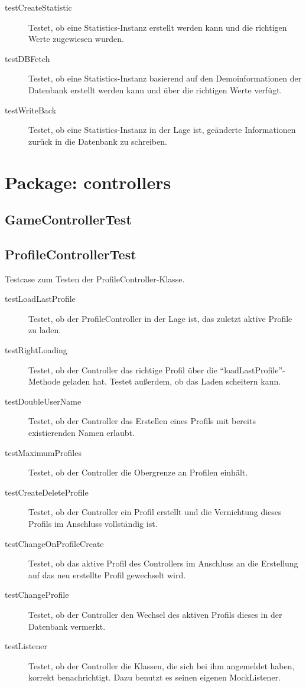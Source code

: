 \documentclass[parskip=full]{scrreprt}
\begin{document}
\begin{description}
	\item[testCreateStatistic] Testet, ob eine Statistics-Instanz erstellt werden kann und die richtigen Werte zugewiesen wurden.
	\item[testDBFetch] Testet, ob eine Statistics-Instanz basierend auf den Demoinformationen der Datenbank erstellt werden kann und über die richtigen Werte verfügt.
	\item[testWriteBack] Testet, ob eine Statistics-Instanz in der Lage ist, geänderte Informationen zurück in die Datenbank zu schreiben.
\end{description}

\clearpage

\section{Package: controllers}

\subsection{GameControllerTest}

\begin{description}
	\item 
\end{description}

\subsection{ProfileControllerTest}

Testcase zum Testen der ProfileController-Klasse.

\begin{description}
	\item[testLoadLastProfile] Testet, ob der ProfileController in der Lage ist, das zuletzt aktive Profile zu laden.
	\item[testRightLoading] Testet, ob der Controller das richtige Profil über die \enquote{loadLastProfile}-Methode geladen hat. Testet außerdem, ob das Laden scheitern kann.
	\item[testDoubleUserName] Testet, ob der Controller das Erstellen eines Profils mit bereits existierenden Namen erlaubt.
	\item[testMaximumProfiles] Testet, ob der Controller die Obergrenze an Profilen einhält.
	\item[testCreateDeleteProfile] Testet, ob der Controller ein Profil erstellt und die Vernichtung dieses Profils im Anschluss vollständig ist.
	\item[testChangeOnProfileCreate] Testet, ob das aktive Profil des Controllers im Anschluss an die Erstellung auf das neu erstellte Profil gewechselt wird.
	\item[testChangeProfile] Testet, ob der Controller den Wechsel des aktiven Profils dieses in der Datenbank vermerkt.
	\item[testListener] Testet, ob der Controller die Klassen, die sich bei ihm angemeldet haben, korrekt benachrichtigt. Dazu benutzt es seinen eigenen MockListener.
\end{description}
\end{document}
